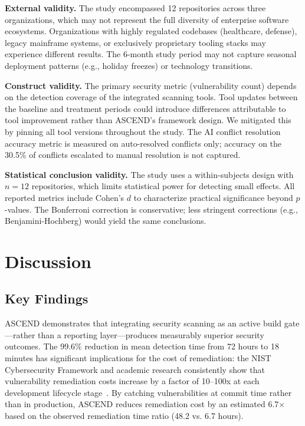 \documentclass[journal]{IEEEtran}
\begin{document}
\textbf{External validity.} The study encompassed 12 repositories across three organizations, which may not represent the full diversity of enterprise software ecosystems. Organizations with highly regulated codebases (healthcare, defense), legacy mainframe systems, or exclusively proprietary tooling stacks may experience different results. The 6-month study period may not capture seasonal deployment patterns (e.g., holiday freezes) or technology transitions.

\textbf{Construct validity.} The primary security metric (vulnerability count) depends on the detection coverage of the integrated scanning tools. Tool updates between the baseline and treatment periods could introduce differences attributable to tool improvement rather than ASCEND's framework design. We mitigated this by pinning all tool versions throughout the study. The AI conflict resolution accuracy metric is measured on auto-resolved conflicts only; accuracy on the 30.5\% of conflicts escalated to manual resolution is not captured.

\textbf{Statistical conclusion validity.} The study uses a within-subjects design with $n=12$ repositories, which limits statistical power for detecting small effects. All reported metrics include Cohen's $d$ to characterize practical significance beyond $p$-values. The Bonferroni correction is conservative; less stringent corrections (e.g., Benjamini-Hochberg) would yield the same conclusions.

\section{Discussion}
\label{sec:discussion}

\subsection{Key Findings}

ASCEND demonstrates that integrating security scanning as an active build gate---rather than a reporting layer---produces measurably superior security outcomes. The 99.6\% reduction in mean detection time from 72 hours to 18 minutes has significant implications for the cost of remediation: the NIST Cybersecurity Framework and academic research consistently show that vulnerability remediation costs increase by a factor of 10--100x at each development lifecycle stage~\cite{mcgraw2006}. By catching vulnerabilities at commit time rather than in production, ASCEND reduces remediation cost by an estimated 6.7$\times$ based on the observed remediation time ratio (48.2 vs. 6.7 hours).
\end{document}
